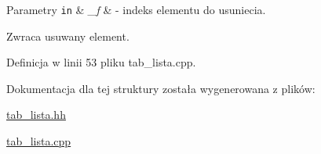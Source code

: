 \begin{DoxyParams}[1]{Parametry}
\mbox{\tt in}  & {\em \-\_\-f} & -\/ indeks elementu do usuniecia. \\
\hline
\end{DoxyParams}
\begin{DoxyReturn}{Zwraca}
usuwany element. 
\end{DoxyReturn}


Definicja w linii 53 pliku tab\-\_\-lista.\-cpp.



Dokumentacja dla tej struktury została wygenerowana z plików\-:\begin{DoxyCompactItemize}
\item 
\hyperlink{tab__lista_8hh}{tab\-\_\-lista.\-hh}\item 
\hyperlink{tab__lista_8cpp}{tab\-\_\-lista.\-cpp}\end{DoxyCompactItemize}
